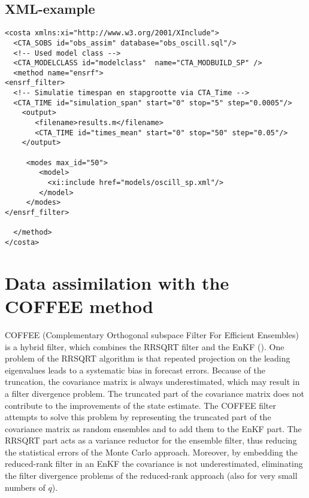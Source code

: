 \subsection{XML-example}
 \begin{verbatim}
<costa xmlns:xi="http://www.w3.org/2001/XInclude">
  <CTA_SOBS id="obs_assim" database="obs_oscill.sql"/>
  <!-- Used model class -->
  <CTA_MODELCLASS id="modelclass"  name="CTA_MODBUILD_SP" />
  <method name="ensrf"> 
<ensrf_filter>
  <!-- Simulatie timespan en stapgrootte via CTA_Time -->
  <CTA_TIME id="simulation_span" start="0" stop="5" step="0.0005"/>
    <output>
       <filename>results.m</filename>
       <CTA_TIME id="times_mean" start="0" stop="50" step="0.05"/>
    </output>

     <modes max_id="50">
        <model>
          <xi:include href="models/oscill_sp.xml"/>
        </model>        
     </modes>
</ensrf_filter>
  
  </method> 
</costa>
 \end{verbatim}




\section{Data assimilation  with the COFFEE method}

COFFEE (Complementary Orthogonal subspace Filter For Efficient Ensembles) is a
hybrid filter, which combines the RRSQRT filter and the EnKF
(\cite{Heemink2001}). One problem of the RRSQRT algorithm is that repeated
projection on the leading eigenvalues leads to a systematic bias in forecast
errors. Because of the truncation, the covariance matrix is always
underestimated, which may result in a filter divergence problem. The truncated
part of the covariance matrix does not contribute to the improvements of the
state estimate. The COFFEE filter attempts to solve this problem by
representing the truncated part of the covariance matrix as random ensembles
and to add them to the EnKF part. The RRSQRT part acts as a variance reductor
for the ensemble filter, thus reducing the statistical errors of the Monte
Carlo approach. Moreover, by embedding the reduced-rank filter in an EnKF the
covariance is not underestimated, eliminating the filter divergence problems of
the reduced-rank approach (also for very small numbers of $q$).

